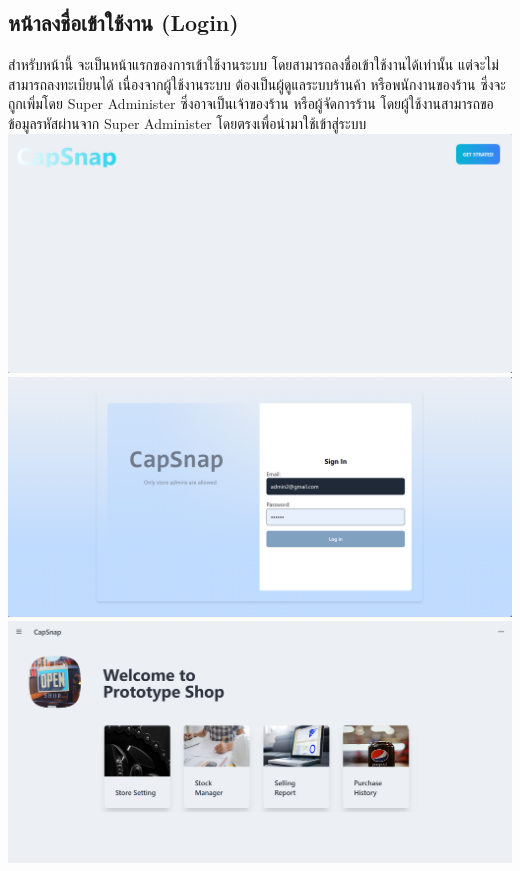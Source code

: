 \subsection{หน้าลงชื่อเข้าใช้งาน (Login)}
สำหรับหน้านี้ จะเป็นหน้าแรกของการเข้าใช้งานระบบ โดยสามารถลงชื่อเข้าใช้งานได้เท่านั้น แต่จะไม่สามารถลงทะเบียนได้ เนื่องจากผู้ใช้งานระบบ ต้องเป็นผู้ดูแลระบบร้านค้า หรือพนักงานของร้าน ซึ่งจะถูกเพิ่มโดย Super Administer ซึ่งอาจเป็นเจ้าของร้าน หรือผู้จัดการร้าน โดยผู้ใช้งานสามารถขอข้อมูลรหัสผ่านจาก Super Administer โดยตรงเพื่อนำมาใช้เข้าสู่ระบบ\\
{
\includegraphics[scale=0.35]{pic/ui/w26.png}
}\\
{
\includegraphics[scale=0.35]{pic/ui/w27.png}
}\\
{
\includegraphics[scale=0.35]{pic/ui/w1.png}
}\\
